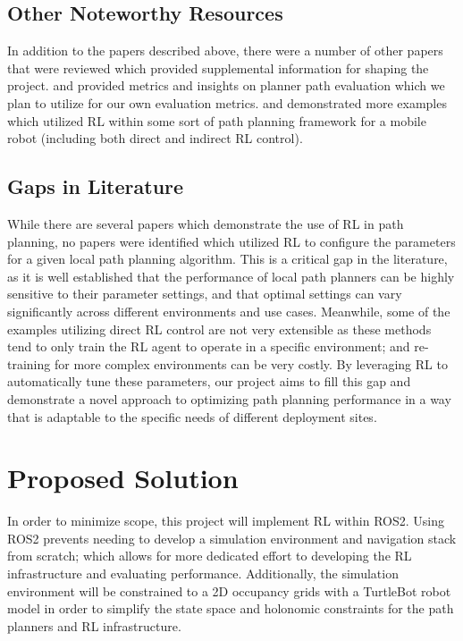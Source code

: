 \documentclass[conference]{IEEEtran}
\begin{document}
        \subsection{Other Noteworthy Resources}
        In addition to the papers described above, there were a number of other papers that were reviewed which provided supplemental information for shaping the project. \cite{b5} and \cite{b6} provided metrics and insights on planner path evaluation which we plan to utilize for our own evaluation metrics. \cite{b7} and \cite{b8} demonstrated more examples which utilized RL within some sort of path planning framework for a mobile robot (including both direct and indirect RL control).

        \subsection{Gaps in Literature}
        While there are several papers which demonstrate the use of RL in path planning, no papers were identified which utilized RL to configure the parameters for a given local path planning algorithm. This is a critical gap in the literature, as it is well established that the performance of local path planners can be highly sensitive to their parameter settings, and that optimal settings can vary significantly across different environments and use cases. Meanwhile, some of the examples utilizing direct RL control are not very extensible as these methods tend to only train the RL agent to operate in a specific environment; and re-training for more complex environments can be very costly. By leveraging RL to automatically tune these parameters, our project aims to fill this gap and demonstrate a novel approach to optimizing path planning performance in a way that is adaptable to the specific needs of different deployment sites.

\section{Proposed Solution}\label{sec:pq_metrics}
In order to minimize scope, this project will implement RL within ROS2. Using ROS2 prevents needing to develop a simulation environment and navigation stack from scratch; which allows for more dedicated effort to developing the RL infrastructure and evaluating performance. Additionally, the simulation environment will be constrained to a 2D occupancy grids with a TurtleBot robot model in order to simplify the state space and holonomic constraints for the path planners and RL infrastructure.
\end{document}
